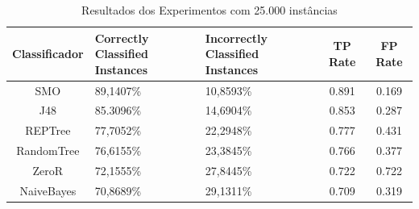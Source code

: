 \documentclass[
	12pt,				%
	openright,			%
	oneside,	
	a4paper,				%
	english,				%
	brazil				%
]{abntex2/abntex2} %
\begin{document}
\begin{table}[htbp]
	\centering
	\caption{Resultados dos Experimentos com 25.000 instâncias}
	\label{tabResultadosExperimentos25k}
	\begin{center}
		\renewcommand{\arraystretch}{2}
		\begin{tabular}{cp{3cm}p{3.2cm}cc}
			\hline
			\textbf{Classificador}                & \textbf{Correctly Classified Instances}               & \textbf{Incorrectly Classified Instances}      	& \textbf{TP Rate}						&\textbf{FP Rate}   \\ \hline
			SMO                                      & 89,1407\%                                                                                 & 10,8593\% 							&0.891									&0.169                                                                                    \\
			J48                                      & 85.3096\%                                                                                  & 14,6904\% 							&0.853										&0.287                                                                                     \\
			REPTree                                  & 77,7052\%                                                                                 & 22,2948\%								&0.777											&0.431                                                                                     \\ 
			RandomTree                               & 76,6155\%                                                                                 & 23,3845\%								&0.766												&0.377                                                                                     \\ \hline \hline
			ZeroR    									& 72,1555\%                                                 									& 27,8445\%								&0.722											&0.722                                                     								\\ 
			NaiveBayes                               & 70,8689\%                                                                                 &  29,1311\%									&0.709												&0.319                                                                                     \\ \hline
		\end{tabular}
	\end{center}
\end{table}
\end{document}
